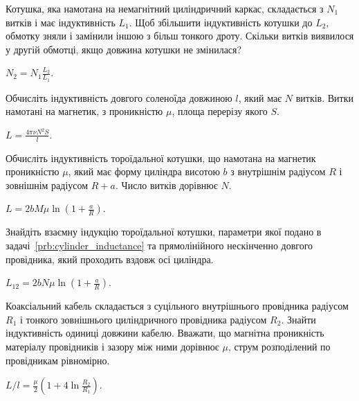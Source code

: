 \begin{problem}%
    Котушка, яка намотана на немагнітний циліндричний
каркас, складається з $N_1$ витків і має індуктивність $L_1$. Щоб
збільшити індуктивність котушки до $L_2$, обмотку зняли і
замінили іншою з більш тонкого дроту. Скільки витків
виявилося у другій обмотці, якщо довжина котушки не змінилася?
\begin{solution}
$N_2 = N_1 \frac{L_2}{L_1}$.
\end{solution}
\end{problem}


\begin{problem}
    Обчисліть індуктивність довгого соленоїда довжиною $l$, який має $N$ витків. Витки намотані на магнетик, з проникністю $\mu$, площа перерізу якого $S$.
\begin{solution}
	$L = \frac{4\pi\nu N^2 S}{l}$.
\end{solution}
\end{problem}

\begin{problem}\label{prb:cylinder_inductance}
    Обчисліть індуктивність тороїдальної котушки, що намотана на магнетик проникністю $\mu$, який має форму циліндра висотою $b$ з внутрішнім радіусом $R$ і зовнішнім радіусом $R + a$. Число витків дорівнює $N$.
\begin{solution}
	$L  = 2bM\mu\ln\left( 1 + \frac{a}{R}\right) $.
\end{solution}
\end{problem}

\begin{problem}
    Знайдіть взаємну індукцію тороїдальної котушки, параметри якої подано в задачі~\ref{prb:cylinder_inductance} та прямолінійного нескінченно довгого провідника, який проходить вздовж осі циліндра.
\begin{solution}
	$L_{12} = 2bN\mu \ln\left( 1 + \frac{a}{R}\right) $.
\end{solution}
\end{problem}

\begin{problem}%
Коаксіальний кабель складається з суцільного внутрішнього провідника радіусом $R_1$ і тонкого зовнішнього циліндричного провідника радіусом $R_2$. Знайти індуктивність одиниці довжини кабелю. Вважати, що магнітна проникність матеріалу провідників і зазору між ними дорівнює $\mu$, струм розподілений по провідникам рівномірно.
\begin{solution}
	$L/l = \frac{\mu}{2} \left( 1 + 4\ln\frac{R_2}{R_1}\right)$.
\end{solution}
\end{problem}

